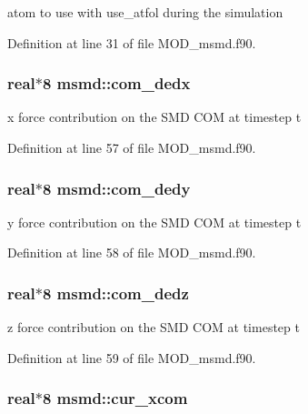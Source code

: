atom to use with use\-\_\-atfol during the simulation 



Definition at line 31 of file M\-O\-D\-\_\-msmd.\-f90.

\hypertarget{classmsmd_a3b682348e3dcf462e291ec488e2462e2}{
\subsubsection[{com\-\_\-dedx}]{\setlength{\rightskip}{0pt plus 5cm}real$\ast$8 msmd\-::com\-\_\-dedx}}\label{classmsmd_a3b682348e3dcf462e291ec488e2462e2}


x force contribution on the S\-M\-D C\-O\-M at timestep t 



Definition at line 57 of file M\-O\-D\-\_\-msmd.\-f90.

\hypertarget{classmsmd_acc40a2acdeb9d72fdaa66c077c28e0b3}{
\subsubsection[{com\-\_\-dedy}]{\setlength{\rightskip}{0pt plus 5cm}real$\ast$8 msmd\-::com\-\_\-dedy}}\label{classmsmd_acc40a2acdeb9d72fdaa66c077c28e0b3}


y force contribution on the S\-M\-D C\-O\-M at timestep t 



Definition at line 58 of file M\-O\-D\-\_\-msmd.\-f90.

\hypertarget{classmsmd_a724443889995ab799ac4d2f5aee9b63e}{
\subsubsection[{com\-\_\-dedz}]{\setlength{\rightskip}{0pt plus 5cm}real$\ast$8 msmd\-::com\-\_\-dedz}}\label{classmsmd_a724443889995ab799ac4d2f5aee9b63e}


z force contribution on the S\-M\-D C\-O\-M at timestep t 



Definition at line 59 of file M\-O\-D\-\_\-msmd.\-f90.

\hypertarget{classmsmd_a9b24104b4d00119969ff95f03e0a68f9}{
\subsubsection[{cur\-\_\-xcom}]{\setlength{\rightskip}{0pt plus 5cm}real$\ast$8 msmd\-::cur\-\_\-xcom}}\label{classmsmd_a9b24104b4d00119969ff95f03e0a68f9}


